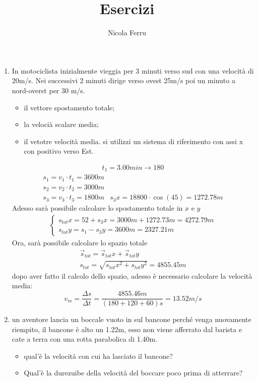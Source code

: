 \documentclass{report}
\title{Esercizi}
\author{Nicola Ferru}
\begin{document}
\maketitle
\begin{enumerate}
\item In motociclista inizialmente vieggia per 3 minuti verso sud con una velocità di 20m/s. Nei successivi 2 minuti dirige verso ovest 25m/s poi un minuto a nord-overst per 30 m/s.
  \begin{itemize}
  \item il vettore spostamento totale;
  \item la velocià scalare media;
  \item il vetotre velocità media. si utilizzi un sistema di riferimento con assi x con positivo verso Est.
  \end{itemize}
  \begin{eqnarray}
    \label{eq:esercizio1}
    t_1=3.00min \to 180
  \end{eqnarray}
  \begin{eqnarray*}
    s_1=v_1\cdot t_1=3600m\\
    s_2=v_2\cdot t_2=3000m\\
    s_3=v_3\cdot t_3=1800m & s_3x = 18800\cdot \cos(45)=1272.78m
  \end{eqnarray*}
  Adesso sarà possibile calcolare lo spostamento totale in $x$ e $y$
  \begin{eqnarray*}
    \begin{cases}
      s_{tot}x= 52+s_3x=3000m+1272.73m=4272.79m \\
      s_{tot}y= s_1-s_3y= 3600m=2327.21m
    \end{cases}
  \end{eqnarray*}
  Ora, sarà possibile calcolare lo spazio totale
  \begin{eqnarray*}
    \vec{s}_{tot}=\vec{s}_{tot}x+\vec{s}_{tot}y\\
    s_{tot}=\sqrt{s_{tot}x^2+s_{tot}y^2}=4855.45m
  \end{eqnarray*}
  dopo aver fatto il calcolo dello spazio, adesso è necessario calcolare la velocità media:
  \begin{equation*}
    v_m=\frac{\Delta s}{\Delta t}=\frac{4855.46m}{(180+120+60)s}=13.52m/s
  \end{equation*}
\item un aventore lancia un boccale vuoto in sul bancone perché venga nuovamente riempito, il bancone è alto un 1.22m, esso non viene afferrato dal barista e cate a terra con una rotta parabolica di 1.40m.
  \begin{itemize}
  \item qual'è la velocità con cui ha lasciato il bancone?
  \item Qual'è la durezuibe della velocità del boccare poco prima di atterrare?
  \end{itemize}
  

\end{enumerate}
\end{document}

